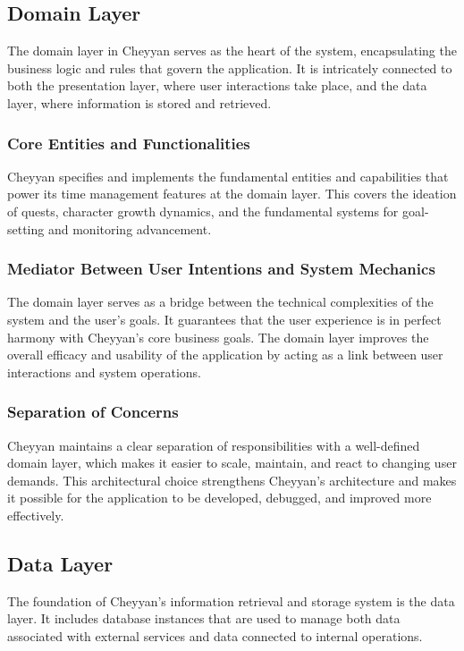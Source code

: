 \documentclass{l4proj}
\begin{document}

\subsection{Domain Layer}

The domain layer in Cheyyan serves as the heart of the system, encapsulating the business logic and rules that govern the application. It is intricately connected to both the presentation layer, where user interactions take place, and the data layer, where information is stored and retrieved.

\subsubsection{Core Entities and Functionalities}
Cheyyan specifies and implements the fundamental entities and capabilities that power its time management features at the domain layer. This covers the ideation of quests, character growth dynamics, and the fundamental systems for goal-setting and monitoring advancement.

\subsubsection{Mediator Between User Intentions and System Mechanics}
The domain layer serves as a bridge between the technical complexities of the system and the user's goals. It guarantees that the user experience is in perfect harmony with Cheyyan's core business goals. The domain layer improves the overall efficacy and usability of the application by acting as a link between user interactions and system operations.

\subsubsection{Separation of Concerns}
Cheyyan maintains a clear separation of responsibilities with a well-defined domain layer, which makes it easier to scale, maintain, and react to changing user demands. This architectural choice strengthens Cheyyan's architecture and makes it possible for the application to be developed, debugged, and improved more effectively.

\subsection{Data Layer}

The foundation of Cheyyan's information retrieval and storage system is the data layer. It includes database instances that are used to manage both data associated with external services and data connected to internal operations.
\end{document}
